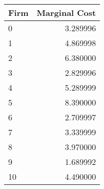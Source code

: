 \begin{tabular}{lr}
\toprule
{Firm} &         Marginal Cost\\
\midrule
0  &  3.289996 \\
1  &  4.869998 \\
2  &  6.380000 \\
3  &  2.829996 \\
4  &  5.289999 \\
5  &  8.390000 \\
6  &  2.709997 \\
7  &  3.339999 \\
8  &  3.970000 \\
9  &  1.689992 \\
10 &  4.490000 \\
\bottomrule
\end{tabular}


